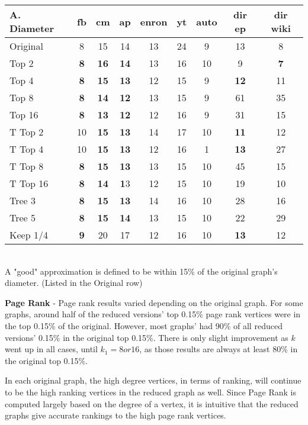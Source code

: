 \documentclass[11pt]{article}
\begin{document}
\begin{tabular}{| l | c | c | c | c | c | c | c | c |}
 \hline
 A. Diameter & fb & cm & ap & \textbf{enron} & yt & \textbf{auto} & dir ep & dir wiki \\ \hline
 Original & 8 & 15 & 14 & 13 & 24 & 9 & 13 & 8\\ \hline
 Top 2 & \textbf{8} & \textbf{16} & \textbf{14} & 13 & 16 & 10 & 9 & \textbf{7}\\ \hline
 Top 4 & \textbf{8} & \textbf{15} & \textbf{13} & 12 & 15 & 9 & \textbf{12} & 11\\ \hline
 Top 8 & \textbf{8} & \textbf{14} & \textbf{12} & 13 & 15 & 9 & 61 & 35\\ \hline
 Top 16 & \textbf{8} & \textbf{13} & \textbf{12} & 12 & 16 & 9 & 31 & 15\\ \hline
 T Top 2 & 10 & \textbf{15} & \textbf{13} & 14 & 17 & 10 & \textbf{11} & 12\\ \hline
 T Top 4 & 10 & \textbf{15} & \textbf{13} & 12 & 16 & 1 & \textbf{13} & 27\\ \hline
 T Top 8 & \textbf{8} & \textbf{15} & \textbf{13} & 13 & 15 & 10 & 45 & 15\\ \hline
 T Top 16 & \textbf{8} & \textbf{14} & \textbf{1}3 & 12 & 15 & 10 & 19 & 10\\ \hline
 Tree 3 & \textbf{8} & \textbf{15} & \textbf{13} & 14 & 16 & 10 & 28 & 16\\ \hline
 Tree 5 & \textbf{8} & \textbf{15} & \textbf{14} & 13 & 15 & 10 & 22 & 29\\ \hline
 Keep 1/4 & \textbf{9} & 20 & 17 & 12 & 16 & 10 & \textbf{13} & 12\\ \hline
 
\end{tabular}\\
A "good" approximation is defined to be within 15\% of the original graph's diameter. (Listed in the Original row)

\textbf{Page Rank} - Page rank results varied depending on the original graph.  For some graphs, around half of the reduced versions' top 0.15\% page rank vertices were in the top 0.15\% of the original. However, most graphs' had 90\% of all reduced versions' 0.15\% in the original top 0.15\%.  There is only slight improvement as $k$ went up in all cases, until $k_1 = 8 or 16$, as those results are always at least 80\% in the original top 0.15\%.

In each original graph, the high degree vertices, in terms of ranking, will continue to be the high ranking vertices in the reduced graph as well.  Since Page Rank is computed largely based on the degree of a vertex, it is intuitive that the reduced graphs give accurate rankings to the high page rank vertices.
\end{document}
